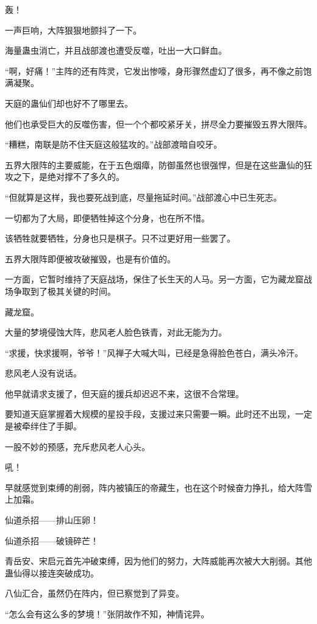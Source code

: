 \begin{this_body}
轰！

一声巨响，大阵狠狠地颤抖了一下。

海量蛊虫消亡，并且战部渡也遭受反噬，吐出一大口鲜血。

“啊，好痛！”主阵的还有阵灵，它发出惨嚎，身形骤然虚幻了很多，再不像之前饱满凝聚。

天庭的蛊仙们却也好不了哪里去。

他们也承受巨大的反噬伤害，但一个个都咬紧牙关，拼尽全力要摧毁五界大限阵。

“糟糕，南联是防不住天庭这般猛攻的。”战部渡暗自咬牙。

五界大限阵的主要威能，在于五色烟瘴，防御虽然也很强悍，但是在这些蛊仙的狂攻之下，是绝对撑不了多久的。

“但就算是这样，我也要死战到底，尽量拖延时间。”战部渡心中已生死志。

一切都为了大局，即便牺牲掉这个分身，也在所不惜。

该牺牲就要牺牲，分身也只是棋子。只不过更好用一些罢了。

五界大限阵即便被攻破摧毁，也是有价值的。

一方面，它暂时维持了天庭战场，保住了长生天的人马。另一方面，它为藏龙窟战场争取到了极其关键的时间。

藏龙窟。

大量的梦境侵蚀大阵，悲风老人脸色铁青，对此无能为力。

“求援，快求援啊，爷爷！”风禅子大喊大叫，已经是急得脸色苍白，满头冷汗。

悲风老人没有说话。

他早就请求支援了，但天庭的援兵却迟迟不来，这很不合常理。

要知道天庭掌握着大规模的星投手段，支援过来只需要一瞬。此时还不出现，一定是被牵绊住了手脚。

一股不妙的预感，充斥悲风老人心头。

吼！

早就感觉到束缚的削弱，阵内被镇压的帝藏生，也在这个时候奋力挣扎，给大阵雪上加霜。

仙道杀招——排山压卵！

仙道杀招——破镜碎芒！

青岳安、宋启元首先冲破束缚，因为他们的努力，大阵威能再次被大大削弱。其他蛊仙得以接连突破成功。

八仙汇合，虽然仍在阵内，但已察觉到了异变。

“怎么会有这么多的梦境！”张阴故作不知，神情诧异。


\end{this_body}
